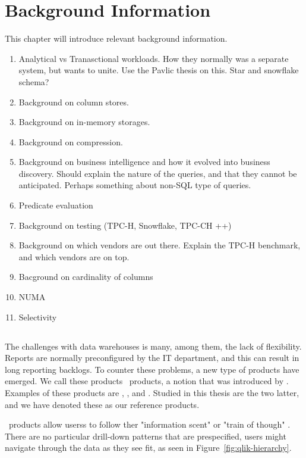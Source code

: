\chapter{Background Information}
\label{chap:background}
\begin{secex}
This chapter will introduce relevant background information.
\begin{enumerate}
  \item Analytical vs Tranasctional workloads. How they normally was a separate system, but wants to unite. Use the Pavlic thesis on this. Star and snowflake schema?
  \item Background on column stores.
  \item Background on in-memory storages.
  \item Background on compression.
  \item Background on business intelligence and how it evolved into business discovery. Should explain the nature of the queries, and that they cannot be anticipated. Perhaps something about non-SQL type of queries.
  \item Predicate evaluation
  \item Background on testing (TPC-H, Snowflake, TPC-CH ++)
  \item Background on which vendors are out there. Explain the TPC-H benchmark, and which vendors are on top.
  \item Bacground on cardinality of columns
  \item NUMA
  \item Selectivity
\end{enumerate}
\end{secex}
\clearpage



\section{\bd}
\label{sec:Business Discovery}
The challenges with data warehouses is many, among them, the lack of flexibility. Reports are normally preconfigured by the IT department, and this can result in long reporting backlogs. To counter these problems, a new type of products have emerged. We call these products \bd~products, a notion that was introduced by \qlikview \cite{Qlik2014-vd}. Examples of these products are \powerpivot, \tableau, and \qlikview. Studied in this thesis are the two latter, and we have denoted these as our reference products.

\bd~products allow userss to follow ther "information scent" or "train of though" \cite{Qlik2014-vd, Kamkolkar2015-iq}. There are no particular drill-down patterns that are prespecified, users might navigate through the data as they see fit, as seen in Figure~\ref{fig:qlik-hierarchy}.

